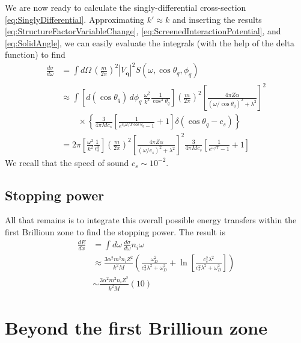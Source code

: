 \documentclass{article}
\begin{document}
We are now ready to calculate the singly-differential cross-section \eqref{eq:SinglyDifferential}. Approximating $k' \approx k$ and inserting the results \eqref{eq:StructureFactorVariableChange}, \eqref{eq:ScreenedInteractionPotential}, and \eqref{eq:SolidAngle}, we can easily evaluate the integrals (with the help of the delta function) to find
\begin{align}
\frac{d \sigma}{d \omega} &= \int d \Omega\, \left( \frac{m}{2 \pi} \right)^2 |V_\textbf{q}|^2 S(\omega, \cos\theta_q, \phi_q) \\
 &\approx \int \left[ d(\cos\theta_q)\,d \phi_q\,\frac{\omega^2}{k^2}\frac{1}{\cos^3 \theta_q} \right] \left( \frac{m}{2 \pi} \right)^2 \left[ \frac{4 \pi Z\alpha}{(\omega / \cos\theta_q)^2+ \lambda^2} \right]^2 \\
 &\qquad \times\left\{ \frac{3}{4 \pi M c_s} \left[ \frac{1}{e^{c_s\omega / T\cos\theta_q} - 1} + 1 \right] \delta(\cos\theta_{q} - c_s) \right\} \nonumber \\
 &= 2 \pi \left[\frac{\omega^2}{k^2}\frac{1}{c_s^3} \right] \left( \frac{m}{2 \pi} \right)^2 \left[ \frac{4 \pi Z\alpha}{(\omega / c_s)^2+ \lambda^2} \right]^2 \frac{3}{4 \pi M c_s} \left[ \frac{1}{e^{\omega / T} - 1} + 1 \right]
\end{align}
We recall that the speed of sound $c_s \sim 10^{-2}$.

\subsection{Stopping power}

All that remains is to integrate this overall possible energy transfers within the first Brillioun zone to find the stopping power. The result is
\begin{align}
\frac{dE}{d x} &= \int d\omega\, \frac{d \sigma}{d \omega} n_i \omega \\
  &\approx \frac{3 \alpha^2 m^2 n_i Z^2}{k^2 M} \left( \frac{\omega_D^2}{c_s^2 \lambda^2 + \omega_D^2} + \ln \left[ \frac{c_s^2 \lambda^2}{c_s^2 \lambda^2 + \omega_D^2} \right]  \right) \\
  &\sim \frac{3 \alpha^2 m^2 n_i Z^2}{k^2 M} (10)
\end{align}

\section{Beyond the first Brillioun zone}
\end{document}
